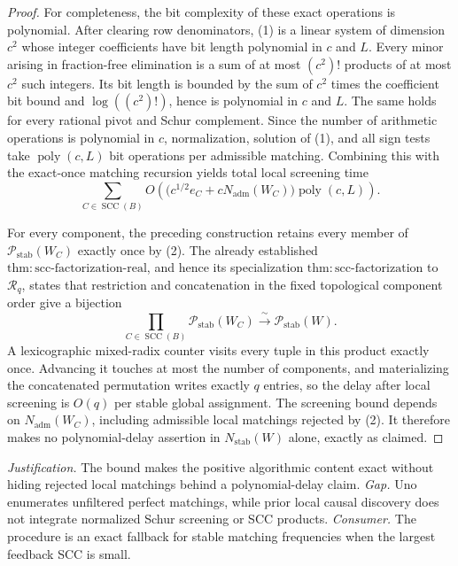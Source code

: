 \documentclass{article}
\begin{document}
\begin{proof}
For completeness, the bit complexity of these exact operations is polynomial.  After clearing row denominators, (1) is a linear system of dimension \(c^2\) whose integer coefficients have bit length polynomial in \(c\) and \(L\).  Every minor arising in fraction-free elimination is a sum of at most \((c^2)!\) products of at most \(c^2\) such integers.  Its bit length is bounded by the sum of \(c^2\) times the coefficient bit bound and \(\log((c^2)!)\), hence is polynomial in \(c\) and \(L\).  The same holds for every rational pivot and Schur complement.  Since the number of arithmetic operations is polynomial in \(c\), normalization, solution of (1), and all sign tests take \(\operatorname{poly}(c,L)\) bit operations per admissible matching.  Combining this with the exact-once matching recursion yields total local screening time
\[
 \sum_{C\in\operatorname{SCC}(B)}
 O\!\left(\bigl(c^{1/2}e_C+cN_{\mathrm{adm}}(W_C)\bigr)
          \operatorname{poly}(c,L)\right).
\]

For every component, the preceding construction retains every member of \(\mathcal P_{\mathrm{stab}}(W_C)\) exactly once by (2).  The already established \(\mathrm{thm:scc\mbox{-}factorization\mbox{-}real}\), and hence its specialization \(\mathrm{thm:scc\mbox{-}factorization}\) to \(\mathcal R_q\), states that restriction and concatenation in the fixed topological component order give a bijection
\[
 \prod_{C\in\operatorname{SCC}(B)}\mathcal P_{\mathrm{stab}}(W_C)
 \xrightarrow{\ \sim\ }
 \mathcal P_{\mathrm{stab}}(W).
\]
A lexicographic mixed-radix counter visits every tuple in this product exactly once.  Advancing it touches at most the number of components, and materializing the concatenated permutation writes exactly \(q\) entries, so the delay after local screening is \(O(q)\) per stable global assignment.  The screening bound depends on \(N_{\mathrm{adm}}(W_C)\), including admissible local matchings rejected by (2).  It therefore makes no polynomial-delay assertion in \(N_{\mathrm{stab}}(W)\) alone, exactly as claimed.
\end{proof}
\par\smallskip\noindent \textit{Justification.} The bound makes the positive algorithmic content exact without hiding rejected local matchings behind a polynomial-delay claim. \textit{Gap.} Uno enumerates unfiltered perfect matchings, while prior local causal discovery does not integrate normalized Schur screening or SCC products. \textit{Consumer.} The procedure is an exact fallback for stable matching frequencies when the largest feedback SCC is small.
\end{document}
